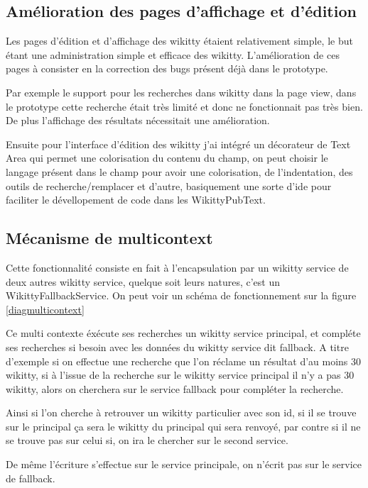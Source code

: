 \subsection{Amélioration des pages d'affichage et d'édition}

Les pages d'édition et d'affichage des wikitty étaient relativement simple, le
but étant une administration simple et efficace des wikitty. L'amélioration de
ces pages à consister en la correction des bugs présent déjà dans le prototype.

Par exemple le support pour les recherches dans wikitty dans la page view,
dans le prototype cette recherche était très limité et donc ne fonctionnait pas
très bien. De plus l'affichage des résultats nécessitait une amélioration.

Ensuite pour l'interface d'édition des wikitty j'ai intégré un décorateur de
Text Area qui permet une colorisation du contenu du champ, on peut choisir le
langage présent dans le champ pour avoir une colorisation, de l'indentation, des
outils de recherche/remplacer et d'autre, basiquement une sorte d'ide pour
faciliter le dévellopement de code dans les WikittyPubText.



\subsection{Mécanisme de multicontext}

Cette fonctionnalité consiste en fait à l'encapsulation par un wikitty service
de deux autres wikitty service, quelque soit leurs natures, c'est un 
WikittyFallbackService. On peut voir un schéma de fonctionnement sur la figure
\ref{diagmulticontext}

Ce multi contexte éxécute ses recherches un wikitty service principal, et
compléte ses recherches si besoin avec les données du wikitty service dit
fallback. A titre d'exemple si on effectue une recherche que l'on réclame un
résultat d'au moins 30 wikitty, si à l'issue de la recherche sur le wikitty 
service principal il n'y a pas 30 wikitty, alors on cherchera sur le service
fallback pour compléter la recherche. 

Ainsi si l'on cherche à retrouver un wikitty particulier avec son id, si il
se trouve sur le principal ça sera le wikitty du principal qui sera renvoyé, 
par contre si il ne se trouve pas sur celui si, on ira le chercher sur le second
service.

De même l'écriture s'effectue sur le service principale, on n'écrit pas sur le
service de fallback.

